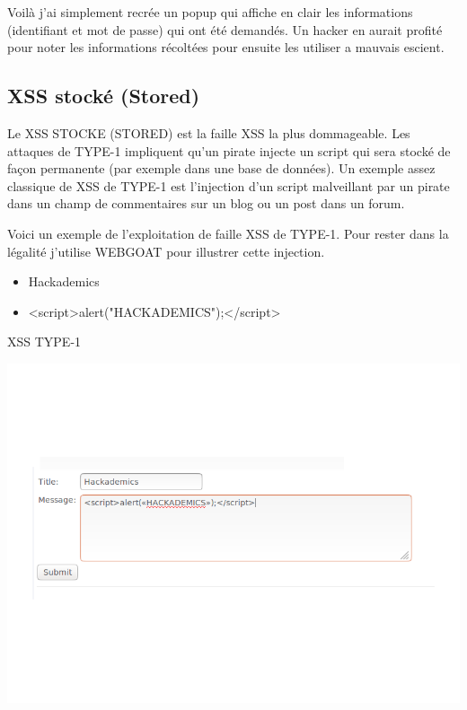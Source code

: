 \begin{flushleft}
Voilà j'ai simplement recrée un popup qui affiche en clair les informations (identifiant et mot de passe) qui ont été demandés. Un hacker en aurait profité pour noter les informations récoltées pour ensuite les utiliser a mauvais escient.
\end{flushleft}

\subsection{XSS stocké (Stored)}\label{vulnerabilites:web:xss:stored}

Le XSS STOCKE (STORED) est la faille XSS la plus dommageable. Les attaques de TYPE-1 impliquent qu'un pirate injecte un script qui sera stocké de façon permanente (par exemple dans une base de données). Un exemple assez classique de XSS de TYPE-1 est l'injection d'un script malveillant par un pirate dans un champ de commentaires sur un blog ou un post dans un forum.

\begin{flushleft}
Voici un exemple de l'exploitation de faille XSS de TYPE-1. Pour rester dans la légalité j'utilise WEBGOAT pour illustrer cette injection.
\end{flushleft}

\bigskip

\begin{itemize}
\item Hackademics
\item <script>alert("HACKADEMICS");</script>
\end{itemize}


\begin{center}
\caption{XSS TYPE-1}
\includegraphics[scale=0.3]{Web/assets/xsst1-0.png}
\end{center}


